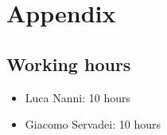 \chapter{Appendix}
\section{Working hours}
\begin{itemize}
	\item Luca Nanni: 10 hours
	\item Giacomo Servadei: 10 hours
\end{itemize}
